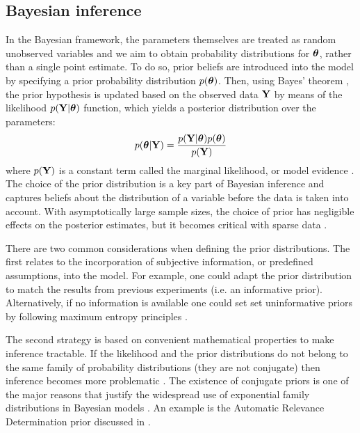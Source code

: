 \subsection{Bayesian inference}  \label{section:bayesian_inference}
In the Bayesian framework, the parameters themselves are treated as random unobserved variables and we aim to obtain probability distributions for $\mbox{\boldmath $\theta$}$, rather than a single point estimate. To do so, prior beliefs are introduced into the model by specifying a prior probability distribution $p(\mbox{\boldmath $\theta$})$. Then, using Bayes' theorem \cite{Bayes1763}, the prior hypothesis is updated based on the observed data ${\bf Y}$ by means of the likelihood $p({\bf Y}|\mbox{\boldmath $\theta$})$ function, which yields a posterior distribution over the parameters:
\[
	p(\mbox{\boldmath $\theta$}|{\bf Y}) = \frac{p({\bf Y}|\mbox{\boldmath $\theta$}) p(\mbox{\boldmath $\theta$})}{p({\bf Y})}
\]
where $p({\bf Y})$ is a constant term called the marginal likelihood, or model evidence \cite{Bishop,Murphy}.\\
The choice of the prior distribution is a key part of Bayesian inference and captures beliefs about the distribution of a variable before the data is taken into account. With asymptotically large sample sizes, the choice of prior has negligible effects on the posterior estimates, but it becomes critical with sparse data \cite{Bishop,Murphy,Gelman2013}.

There are two common considerations when defining the prior distributions. The first relates to the incorporation of subjective information, or predefined assumptions, into the model. For example, one could adapt the prior distribution to match the results from previous experiments (i.e. an informative prior). Alternatively, if no information is available one could set set uninformative priors by following maximum entropy principles \cite{Jaynes1968}.

The second strategy is based on convenient mathematical properties to make inference tractable. If the likelihood and the prior distributions do not belong to the same family of probability distributions (they are not conjugate) then inference becomes more problematic \cite{Raiffa1961,Bishop,Murphy,Gelman2013}. The existence of conjugate priors is one of the major reasons that justify the widespread use of exponential family distributions in Bayesian models \cite{Gelman2013}. An example is the Automatic Relevance Determination prior discussed in .

